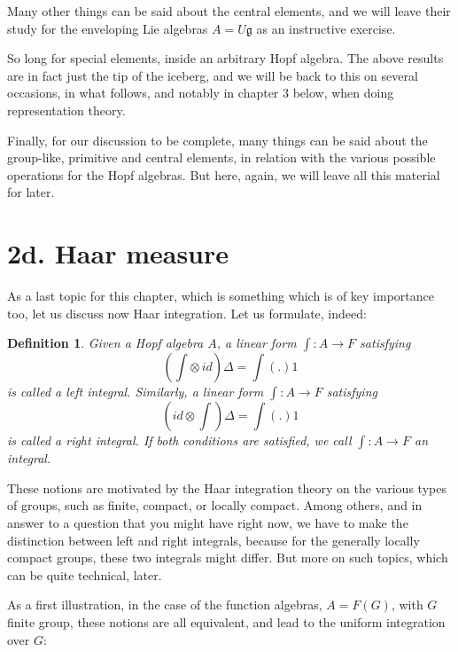 \documentclass[12pt]{amsbook}
\newtheorem{definition}[theorem]{Definition}
\begin{document}
Many other things can be said about the central elements, and we will leave their study for the enveloping Lie algebras $A=U\mathfrak g$ as an instructive exercise. 

\bigskip

So long for special elements, inside an arbitrary Hopf algebra. The above results are in fact just the tip of the iceberg, and we will be back to this on several occasions, in what follows, and notably in chapter 3 below, when doing representation theory.

\bigskip

Finally, for our discussion to be complete, many things can be said about the group-like, primitive and central elements, in relation with the various possible operations for the Hopf algebras. But here, again, we will leave all this material for later.

\section*{2d. Haar measure} 

As a last topic for this chapter, which is something which is of key importance too, let us discuss now Haar integration. Let us formulate, indeed:


\begin{definition}
Given a Hopf algebra $A$, a linear form $\int:A\to F$ satisfying
$$\left(\int\otimes\,id\right)\Delta=\int(.)1$$
is called a left integral. Similarly,  a linear form $\int:A\to F$ satisfying
$$\left(id\otimes\int\right)\Delta=\int(.)1$$
is called a right integral. If both conditions are satisfied, we call $\int:A\to F$ an integral.
\end{definition}

These notions are motivated by the Haar integration theory on the various types of groups, such as finite, compact, or locally compact. Among others, and in answer to a question that you might have right now, we have to make the distinction between left and right integrals, because for the generally locally compact groups, these two integrals might differ. But more on such topics, which can be quite technical, later. 

\bigskip

As a first illustration, in the case of the function algebras, $A=F(G)$, with $G$ finite group, these notions are all equivalent, and lead to the uniform integration over $G$:
\end{document}
